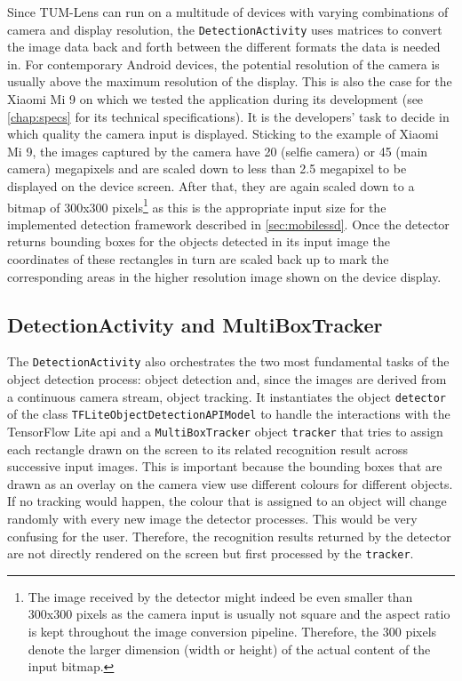 \documentclass[
			   fontsize=11pt,
               paper=a4,
               bibliography=totoc,
               idxtotoc,
               headsepline,
               footsepline,
               footinclude=false,
               BCOR=12mm,
               DIV=13,
               openany,   %
               oneside    %
               ]
               {scrbook}
\newcommand{\code}[1]{\lstinline[basicstyle = \ttfamily\small]{#1}} %
\begin{document}
Since TUM-Lens can run on a multitude of devices with varying combinations of camera and display resolution, the \code{DetectionActivity} uses matrices to convert the image data back and forth between the different formats the data is needed in. For contemporary Android devices, the potential resolution of the camera is usually above the maximum resolution of the display. This is also the case for the Xiaomi Mi 9 on which we tested the application during its development (see \autoref{chap:specs} for its technical specifications). It is the developers' task to decide in which quality the camera input is displayed. Sticking to the example of Xiaomi Mi 9, the images captured by the camera have 20 (selfie camera) or 45 (main camera) megapixels and are scaled down to less than 2.5 megapixel to be displayed on the device screen. After that, they are again scaled down to a bitmap of 300x300 pixels\footnote{The image received by the detector might indeed be even smaller than 300x300 pixels as the camera input is usually not square and the aspect ratio is kept throughout the image conversion pipeline. Therefore, the 300 pixels denote the larger dimension (width or height) of the actual content of the input bitmap.} as this is the appropriate input size for the implemented detection framework described in \autoref{sec:mobilessd}. Once the detector returns bounding boxes for the objects detected in its input image the coordinates of these rectangles in turn are scaled back up to mark the corresponding areas in the higher resolution image shown on the device display.

\subsection{DetectionActivity and MultiBoxTracker} \label{ssec:detectionAndTracking}

The \code{DetectionActivity} also orchestrates the two most fundamental tasks of the object detection process: object detection and, since the images are derived from a continuous camera stream, object tracking. It instantiates the object \code{detector} of the class \code{TFLiteObjectDetectionAPIModel} to handle the interactions with the TensorFlow Lite \gls{api} and a \code{MultiBoxTracker} object \code{tracker} that tries to assign each rectangle drawn on the screen to its related recognition result across successive input images. This is important because the bounding boxes that are drawn as an overlay on the camera view use different colours for different objects. If no tracking would happen, the colour that is assigned to an object will change randomly with every new image the detector processes. This would be very confusing for the user. Therefore, the recognition results returned by the detector are not directly rendered on the screen but first processed by the \code{tracker}. \\
\end{document}
